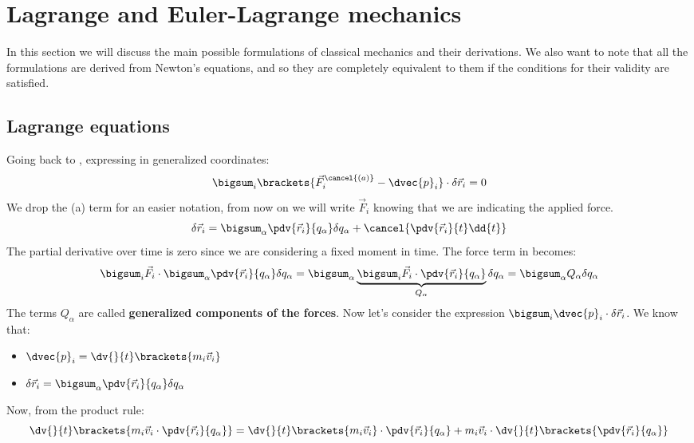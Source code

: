 \chapter{Lagrange and Euler-Lagrange mechanics}
In this section we will discuss the main possible formulations of classical mechanics and their derivations. We also want to note that all the formulations are derived from Newton's equations, and so they are completely equivalent to them if the conditions for their validity are satisfied.
\section{Lagrange equations}
Going back to \dalembertref, expressing in generalized coordinates:
\begin{equation}
    \bigsum_i \brackets{\vec{F}^{\cancel{(a)}}_i - \dvec{p}_i} \cdot \delta \vec{r}_i = 0
\end{equation}
We drop the (a) term for an easier notation, from now on we will write $\vec{F}_i$ knowing that we are indicating the applied force.
\begin{equation}
    \delta \vec{r}_i = \bigsum_{\alpha} \pdv{ \vec{r}_i}{ q_{\alpha}} \delta q_{\alpha} + \cancel{\pdv{ \vec{r}_i}{ t} \dd{t}}
\end{equation}
The partial derivative over time is zero since we are considering a fixed moment in time. The force term in \dalembertref\;becomes:
\begin{equation}
    \bigsum_i \vec{F}_i \cdot \bigsum_{\alpha} \pdv{ \vec{r}_i}{ q_{\alpha}} \delta q_{\alpha} = \bigsum_{\alpha}\underbrace{\bigsum_{i} \vec{F}_i \cdot \pdv{ \vec{r}_i}{ q_{\alpha}}}_{Q_{\alpha}} \delta q_{\alpha} = \bigsum_{\alpha}Q_{\alpha}\delta q_{\alpha}
\end{equation}
The terms $Q_{\alpha}$ are called \textbf{generalized components of the forces}.
Now let's consider the expression $\bigsum_i \dvec{p}_i \cdot \delta \vec{r}_i$. We know that:
\begin{itemize}
    \item $\dvec{p}_i = \dv{}{t}\brackets{m_i\vec{v}_i}$
    \item $\delta \vec{r}_i = \bigsum_{\alpha} \pdv{ \vec{r}_i}{ q_{\alpha}}\delta q_{\alpha}$
\end{itemize}
Now, from the product rule:
\begin{equation} \label{e:total_deriv}
    \dv{}{t}\brackets{m_i\vec{v}_i \cdot \pdv{ \vec{r}_i}{ q_{\alpha}}} = \dv{}{t}\brackets{m_i\vec{v}_i}\cdot \pdv{ \vec{r}_i}{ q_{\alpha}} + m_i\vec{v}_i \cdot \dv{}{t}\brackets{\pdv{ \vec{r}_i}{ q_{\alpha}}}
\end{equation}
